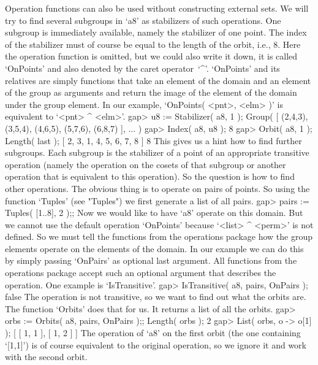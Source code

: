 Operation functions can also be used  without constructing external sets.
We will  try to find  several  subgroups in `a8'   as stabilizers of such
operations. One subgroup  is immediately available, namely the stabilizer
of one point. The index of the stabilizer must  of course be equal to the
length of the orbit, i.e., 8. Here the operation function is omitted, but
we could also write it down, it is called  `OnPoints' and also denoted by
the caret operator~`^'. `OnPoints' and its relatives are simply functions
that  take an  element of  the  domain  and an  element  of the  group as
arguments  and return the  image of the element   of the domain under the
group element. In  our example, `OnPoints(  <pnt>, <elm> )' is equivalent
to `<pnt> ^ <elm>'.
\beginexample
    gap> u8 := Stabilizer( a8, 1 );
    Group( [ (2,4,3), (3,5,4), (4,6,5), (5,7,6), (6,8,7) ], ... )
    gap> Index( a8, u8 );
    8
    gap> Orbit( a8, 1 ); Length( last );
    [ 2, 3, 1, 4, 5, 6, 7, 8 ]
    8
\endexample
This gives us a hint how to find further  subgroups. Each subgroup is the
stabilizer of a point of an appropriate  transitive operation (namely the
operation  on  the cosets of that  subgroup  or another operation that is
equivalent to  this operation).  So the question   is how  to find  other
operations. The obvious thing is to operate  on pairs of points. So using
the function `Tuples'  (see  "Tuples") we first generate  a  list  of all
pairs.
\beginexample
    gap> pairs := Tuples( [1..8], 2 );;
\endexample
Now we would like to have `a8' operate on this  domain. But we cannot use
the  default operation `OnPoints'  because    `<list> ^ <perm>' is    not
defined. So we  must tell the functions  from the operations package  how
the group elements operate on the elements of  the domain. In our example
we can do this by simply passing `OnPairs' as optional last argument. All
functions  from the operations package  accept  such an optional argument
that describes the operation. One example is `IsTransitive'.
\beginexample
    gap> IsTransitive( a8, pairs, OnPairs );
    false 
\endexample
The operation is not transitive,  so we want to  find out what the orbits
are. The function `Orbits' does that for us. It returns a list of all the
orbits.
\beginexample
    gap> orbs := Orbits( a8, pairs, OnPairs );; Length( orbs );
    2
    gap> List( orbs, o -> o[1] );
    [ [ 1, 1 ], [ 1, 2 ] ]
\endexample
The operation of `a8' on the first orbit  (the one containing `[1,1]') is
of course equivalent to the original operation,  so we ignore it and work
with the second orbit.
\beginexample
